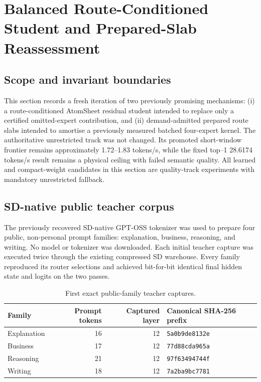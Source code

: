 \section{Balanced Route-Conditioned Student and Prepared-Slab Reassessment}
\label{sec:gptoss-balanced-student-slab-20260912}
\begingroup
\setlength{\emergencystretch}{3em}

\subsection{Scope and invariant boundaries}

This section records a fresh iteration of two previously promising mechanisms:
(i) a route-conditioned AtomSheet residual student intended to replace only a
certified omitted-expert contribution, and (ii) demand-admitted prepared route
slabs intended to amortise a previously measured batched four-expert kernel.
The authoritative unrestricted track was not changed.  Its promoted short-window
frontier remains approximately 1.72--1.83 tokens/s, while the fixed top--1
28.6174 tokens/s result remains a physical ceiling with failed semantic quality.
All learned and compact-weight candidates in this section are quality-track
experiments with mandatory unrestricted fallback.

\subsection{SD-native public teacher corpus}

The previously recovered SD-native GPT-OSS tokenizer was used to prepare four
public, non-personal prompt families: explanation, business, reasoning, and
writing.  No model or tokenizer was downloaded.  Each initial teacher capture
was executed twice through the existing compressed SD warehouse.  Every family
reproduced its router selections and achieved bit-for-bit identical final hidden
state and logits on the two passes.

\begin{table}[htbp]
\centering
\small
\begin{tabularx}{\linewidth}{lrrl}
\toprule
Family & Prompt tokens & Captured layer & Canonical SHA-256 prefix \\
\midrule
Explanation & 16 & 12 & \texttt{5a0b9de8132e} \\
Business & 17 & 12 & \texttt{77d88cda965a} \\
Reasoning & 21 & 12 & \texttt{97f63494744f} \\
Writing & 18 & 12 & \texttt{7a2ba9bc7781} \\
\bottomrule
\end{tabularx}
\caption{First exact public-family teacher captures.}
\end{table}

